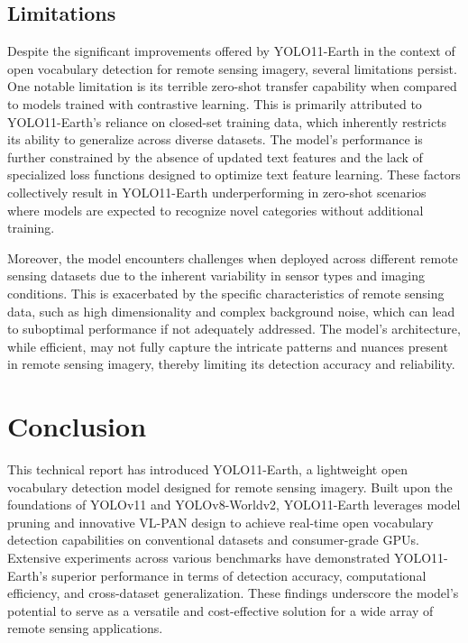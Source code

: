 \documentclass{article}
\begin{document}
\subsection{ Limitations}
Despite the significant improvements offered by YOLO11-Earth in the context of open vocabulary detection for 
remote sensing imagery, several limitations persist. One notable limitation is its terrible zero-shot transfer 
capability when compared to models trained with contrastive learning. This is primarily attributed to 
YOLO11-Earth's reliance on closed-set training data, which inherently restricts its ability to generalize 
across diverse datasets. The model's performance is further constrained by the absence of updated text features 
and the lack of specialized loss functions designed to optimize text feature learning. These factors collectively 
result in YOLO11-Earth underperforming in zero-shot scenarios where models are expected to recognize novel 
categories without additional training.

Moreover, the model encounters challenges when deployed across different remote sensing datasets due to the 
inherent variability in sensor types and imaging conditions. This is exacerbated by the specific characteristics 
of remote sensing data, such as high dimensionality and complex background noise, which can lead to suboptimal 
performance if not adequately addressed. The model's architecture, while efficient, may not fully capture the 
intricate patterns and nuances present in remote sensing imagery, thereby limiting its detection accuracy and 
reliability.

\section{Conclusion}
This technical report has introduced YOLO11-Earth, a lightweight open vocabulary detection model designed for 
remote sensing imagery. Built upon the foundations of YOLOv11 and YOLOv8-Worldv2, YOLO11-Earth leverages model 
pruning and innovative VL-PAN design to achieve real-time open vocabulary detection capabilities on conventional 
datasets and consumer-grade GPUs. Extensive experiments across various benchmarks have demonstrated 
YOLO11-Earth's superior performance in terms of detection accuracy, computational efficiency, and 
cross-dataset generalization. These findings underscore the model's potential to serve as a versatile 
and cost-effective solution for a wide array of remote sensing applications.
\end{document}
